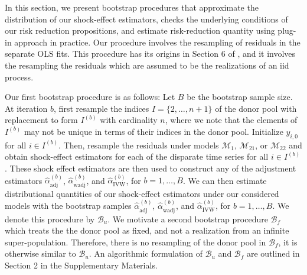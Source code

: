 \documentclass[11pt]{article}
\def\mrm#1{\mathrm{#1}} %
\def\mc#1{\mathcal{#1}} %
\theoremstyle{definition}
\begin{document}
In this section, we present bootstrap procedures that approximate the distribution of our shock-effect estimators, checks the underlying conditions of our risk reduction propositions, and estimate risk-reduction quantity using plug-in approach in practice. Our procedure involves the resampling of residuals in the separate OLS fits. This procedure has its origins in Section 6 of \citet{efron1986bootstrap}, and it involves the resampling the residuals which are assumed to be the realizations of an iid process.

Our first bootstrap procedure is as follows: Let $B$ be the bootstrap sample size. At iteration $b$, first resample the indices $I = \{2, \ldots, n+1\}$ of the donor pool with replacement to form $I^{(b)}$ with cardinality $n$, where we note that the elements of $I^{(b)}$ may not be unique in terms of their  indices in the donor pool. Initialize $y_{i,0}$ for all $i \in I^{(b)}$. Then, resample the residuals under models $\mc{M}_1$, $\mc{M}_{21}$, or $\mc{M}_{22}$ and obtain shock-effect estimators for each of the disparate time series for all $i \in I^{(b)}$. These shock effect estimators are then used to construct any of the adjustment estimators $\hat{\alpha}^{(b)}_{\mrm{adj}}$, $\hat{\alpha}^{(b)}_{\mrm{wadj}}$, and $\hat{\alpha}^{(b)}_{\mrm{IVW}}$, for $b = 1,\ldots,B$. We can then estimate distributional quantities of our shock-effect estimators under our considered models with the bootstrap samples $\hat{\alpha}^{(b)}_{\mrm{adj}}$, $\hat{\alpha}^{(b)}_{\mrm{wadj}}$, and $\hat{\alpha}^{(b)}_{\mrm{IVW}}$, for $b = 1,\ldots,B$. We denote this procedure by $\mc{B}_u$. We motivate a second bootstrap procedure $\mc{B}_f$ which treats the the donor pool as fixed, and not a realization from an infinite super-population. Therefore, there is no resampling of the donor pool in $\mc{B}_f$, it is otherwise similar to $\mc{B}_u$. An algorithmic formulation of $\mc{B}_u$ and $\mc{B}_f$  are outlined in Section 2 in the Supplementary Materials.
\end{document}
